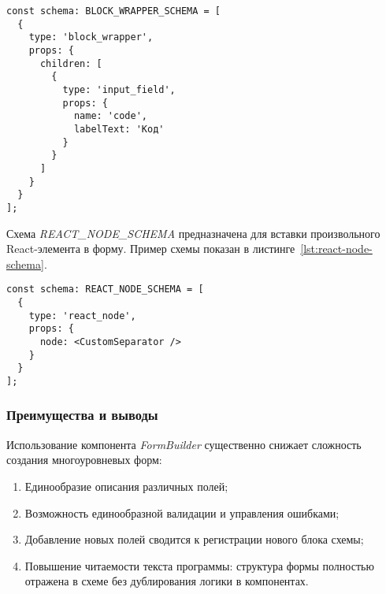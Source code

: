 \begin{lstlisting}[caption={Пример \textit{BLOCK\_WRAPPER\_SCHEMA}},label={lst:block-wrapper-schema}]
const schema: BLOCK_WRAPPER_SCHEMA = [
  {
    type: 'block_wrapper',
    props: {
      children: [
        {
          type: 'input_field',
          props: {
            name: 'code',
            labelText: 'Код'
          }
        }
      ]
    }
  }
];
\end{lstlisting}

Схема \textit{REACT\_NODE\_SCHEMA} предназначена для вставки произвольного React-элемента в форму. Пример схемы показан в листинге~\ref{lst:react-node-schema}.

\begin{lstlisting}[caption={Пример \textit{REACT\_NODE\_SCHEMA}},label={lst:react-node-schema}]
const schema: REACT_NODE_SCHEMA = [
  {
    type: 'react_node',
    props: {
      node: <CustomSeparator />
    }
  }
];
\end{lstlisting}

\subsubsection{Преимущества и выводы}
Использование компонента \textit{FormBuilder} существенно снижает сложность создания многоуровневых форм:
\begin{enumerate}
  \item Единообразие описания различных полей;
  \item Возможность единообразной валидации и управления ошибками;
  \item Добавление новых полей сводится к регистрации нового блока схемы;
  \item Повышение читаемости текста программы: структура формы полностью отражена в схеме без дублирования логики в компонентах.
\end{enumerate}

